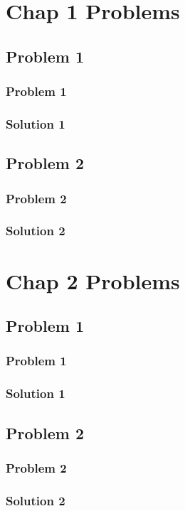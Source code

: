 \documentclass{scrbook}
\begin{document}
\chapter{Chap 1 Problems}
\section{Problem 1}
\subsection{Problem 1}
\lipsum[1]
\subsection{Solution 1}
\lipsum[1-7]
\newpage
\section{Problem 2}
\subsection{Problem 2}
\lipsum[1]
\subsection{Solution 2}
\lipsum[1-4]

\chapter{Chap 2 Problems}
\section{Problem 1}
\subsection{Problem 1}
\lipsum[1]
\newpage
\subsection{Solution 1}
\lipsum[1]
\newpage
\section{Problem 2}
\subsection{Problem 2}
\lipsum[1]
\subsection{Solution 2}
\lipsum[1]
\end{document}
